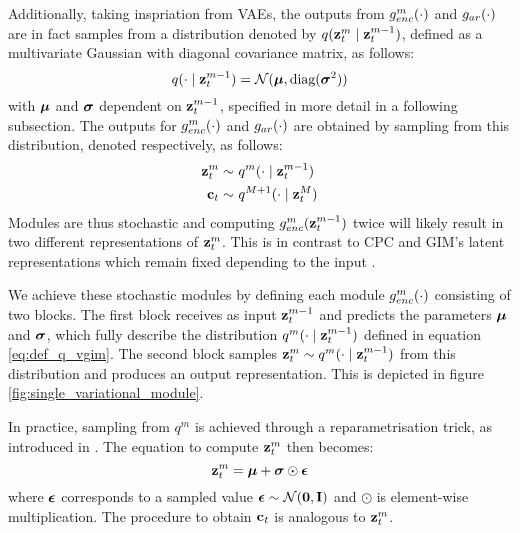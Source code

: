 			Additionally, taking inspriation from VAEs, the outputs from $g_{enc}^m(\cdot)$ and $g_{ar}(\cdot)$ are in fact samples from a distribution denoted by $q(\mathbf{z}_t^m \mid \mathbf{z}_t^{m-1})$, defined as a multivariate Gaussian with diagonal covariance matrix, as follows:
			\begin{equation}
				q(\cdot \mid \mathbf{z}_t^{m-1}) = \mathcal{N}(\bm{\mu}, \text{diag}(\bm{\sigma}^2)) \label{eq:def_q_vgim}
			\end{equation}
			with $\bm{\mu}$ and $\bm{\sigma}$ dependent on $\mathbf{z}_t^{m-1}$, specified in more detail in a following subsection.
			The outputs for $g_{enc}^m(\cdot)$ and $g_{ar}(\cdot)$ are obtained by sampling from this distribution, denoted respectively, as follows:
 			\begin{align} %
			 	\sample{\zt^m}~ & \qfromzmneg  \label{eq:sample_z_from_q} \\
			 	\sample{\ct}~ & \qfromzM
			 \end{align}
			Modules are thus stochastic and computing $g_{enc}^m(\mathbf{z}_t^{m-1})$ twice will likely result in two different representations of $\mathbf{z}_t^m$. This is in contrast to CPC and GIM's latent representations which remain fixed depending to the input \citep{oordRepresentationLearningContrastive2019, lowePuttingEndEndtoEnd2020}.
		
			We achieve these stochastic modules by defining each module $g_{enc}^m(\cdot)$ consisting of two blocks. The first block receives as input $\mathbf{z}_t^{m-1}$ and predicts the parameters $\bm{\mu}$ and $\bm{\sigma}$, which fully describe the distribution $q^m(\cdot \mid \mathbf{z}_t^{m-1})$ defined in equation \ref{eq:def_q_vgim}. The second block samples $\mathbf{z}_t^m \sim q^m(\cdot \mid \mathbf{z}_t^{m-1})$ from this distribution and produces an output representation. This is depicted in figure \ref{fig:single_variational_module}.
			
			
			
			In practice, sampling from $q^m$ is achieved through a reparametrisation trick, as introduced in \citep{kingmaAutoEncodingVariationalBayes2022}. The equation to compute $\mathbf{z}_t^m$ then becomes:
			\begin{equation*}
				\mathbf{z}_t^m = \bm{\mu} + \bm{\sigma} \odot \bm{\epsilon}
			\end{equation*}
			where $\bm{\epsilon}$ corresponds to a sampled value $\bm{\epsilon} \sim \mathcal{N}(\bm{\mathbf{0}}, \mathbf{I})$ and $\odot$ is element-wise multiplication. The procedure to obtain $\mathbf{c}_t$ is analogous to $\mathbf{z}_t^m$.
			
